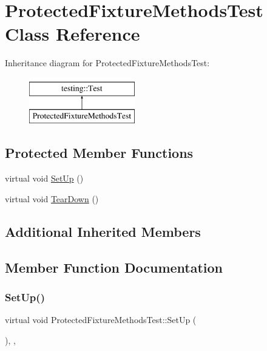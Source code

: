 \hypertarget{classProtectedFixtureMethodsTest}{}\section{Protected\+Fixture\+Methods\+Test Class Reference}
\label{classProtectedFixtureMethodsTest}
Inheritance diagram for Protected\+Fixture\+Methods\+Test\+:\begin{figure}[H]
\begin{center}
\leavevmode
\includegraphics[height=2.000000cm]{classProtectedFixtureMethodsTest}
\end{center}
\end{figure}
\subsection*{Protected Member Functions}
\begin{DoxyCompactItemize}
\item 
virtual void \mbox{\hyperlink{classProtectedFixtureMethodsTest_a5184c708ac89cfb69f0e4c742e93398a}{Set\+Up}} ()
\item 
virtual void \mbox{\hyperlink{classProtectedFixtureMethodsTest_aa143dff0a99903cde207b6fd0042c03c}{Tear\+Down}} ()
\end{DoxyCompactItemize}
\subsection*{Additional Inherited Members}


\subsection{Member Function Documentation}
\mbox{\label{classProtectedFixtureMethodsTest_a5184c708ac89cfb69f0e4c742e93398a}} 
\subsubsection{\texorpdfstring{SetUp()}{SetUp()}}
{\footnotesize\ttfamily virtual void Protected\+Fixture\+Methods\+Test\+::\+Set\+Up (\begin{DoxyParamCaption}{ }\end{DoxyParamCaption})\hspace{0.3cm}{\ttfamily [inline]}, {\ttfamily [protected]}, {\ttfamily [virtual]}}



